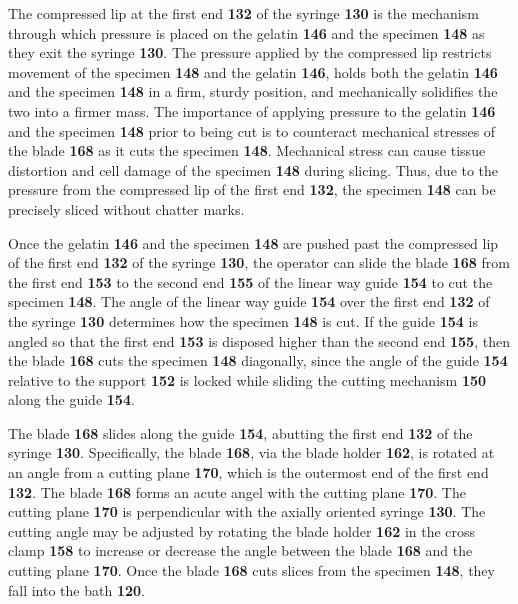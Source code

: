 \documentclass{article}
\begin{document}
The compressed lip at the first end \textbf{132} of the syringe \textbf{130} is the mechanism through which pressure is placed on the gelatin \textbf{146} and the specimen \textbf{148} as they exit the syringe \textbf{130}. The pressure applied by the compressed lip restricts movement of the specimen \textbf{148} and the gelatin \textbf{146}, holds both the gelatin \textbf{146} and the specimen \textbf{148} in a firm, sturdy position, and mechanically solidifies the two into a firmer mass. The importance of applying pressure to the gelatin \textbf{146} and the specimen \textbf{148} prior to being cut is to counteract mechanical stresses of the blade \textbf{168} as it cuts the specimen \textbf{148}. Mechanical stress can cause tissue distortion and cell damage of the specimen \textbf{148} during slicing. Thus, due to the pressure from the compressed lip of the first end \textbf{132}, the specimen \textbf{148} can be precisely sliced without chatter marks.

Once the gelatin \textbf{146} and the specimen \textbf{148} are pushed past the compressed lip of the first end \textbf{132} of the syringe \textbf{130}, the operator can slide the blade \textbf{168} from the first end \textbf{153} to the second end \textbf{155} of the linear way guide \textbf{154} to cut the specimen \textbf{148}. The angle of the linear way guide \textbf{154} over the first end \textbf{132} of the syringe \textbf{130} determines how the specimen \textbf{148} is cut. If the guide \textbf{154} is angled so that the first end \textbf{153} is disposed higher than the second end \textbf{155}, then the blade \textbf{168} cuts the specimen \textbf{148} diagonally, since the angle of the guide \textbf{154} relative to the support \textbf{152} is locked while sliding the cutting mechanism \textbf{150} along the guide \textbf{154}.

The blade \textbf{168} slides along the guide \textbf{154}, abutting the first end \textbf{132} of the syringe \textbf{130}. Specifically, the blade \textbf{168}, via the blade holder \textbf{162}, is rotated at an angle from a cutting plane \textbf{170}, which is the outermost end of the first end \textbf{132}. The blade \textbf{168} forms an acute angel with the cutting plane \textbf{170}. The cutting plane \textbf{170} is perpendicular with the axially oriented syringe \textbf{130}. The cutting angle may be adjusted by rotating the blade holder \textbf{162} in the cross clamp \textbf{158} to increase or decrease the angle between the blade \textbf{168} and the cutting plane \textbf{170}. Once the blade \textbf{168} cuts slices from the specimen \textbf{148}, they fall into the bath \textbf{120}.
\end{document}
